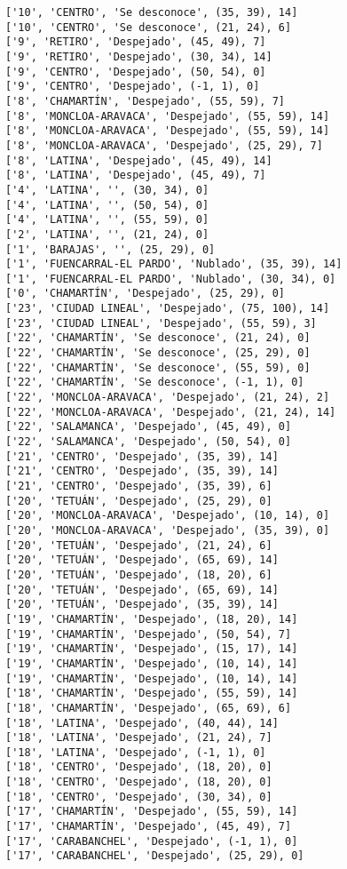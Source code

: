 \documentclass[11pt]{article}
\begin{document}
\begin{Verbatim}[commandchars=\\\{\}]
['10', 'CENTRO', 'Se desconoce', (35, 39), 14]
['10', 'CENTRO', 'Se desconoce', (21, 24), 6]
['9', 'RETIRO', 'Despejado', (45, 49), 7]
['9', 'RETIRO', 'Despejado', (30, 34), 14]
['9', 'CENTRO', 'Despejado', (50, 54), 0]
['9', 'CENTRO', 'Despejado', (-1, 1), 0]
['8', 'CHAMARTÍN', 'Despejado', (55, 59), 7]
['8', 'MONCLOA-ARAVACA', 'Despejado', (55, 59), 14]
['8', 'MONCLOA-ARAVACA', 'Despejado', (55, 59), 14]
['8', 'MONCLOA-ARAVACA', 'Despejado', (25, 29), 7]
['8', 'LATINA', 'Despejado', (45, 49), 14]
['8', 'LATINA', 'Despejado', (45, 49), 7]
['4', 'LATINA', '', (30, 34), 0]
['4', 'LATINA', '', (50, 54), 0]
['4', 'LATINA', '', (55, 59), 0]
['2', 'LATINA', '', (21, 24), 0]
['1', 'BARAJAS', '', (25, 29), 0]
['1', 'FUENCARRAL-EL PARDO', 'Nublado', (35, 39), 14]
['1', 'FUENCARRAL-EL PARDO', 'Nublado', (30, 34), 0]
['0', 'CHAMARTÍN', 'Despejado', (25, 29), 0]
['23', 'CIUDAD LINEAL', 'Despejado', (75, 100), 14]
['23', 'CIUDAD LINEAL', 'Despejado', (55, 59), 3]
['22', 'CHAMARTÍN', 'Se desconoce', (21, 24), 0]
['22', 'CHAMARTÍN', 'Se desconoce', (25, 29), 0]
['22', 'CHAMARTÍN', 'Se desconoce', (55, 59), 0]
['22', 'CHAMARTÍN', 'Se desconoce', (-1, 1), 0]
['22', 'MONCLOA-ARAVACA', 'Despejado', (21, 24), 2]
['22', 'MONCLOA-ARAVACA', 'Despejado', (21, 24), 14]
['22', 'SALAMANCA', 'Despejado', (45, 49), 0]
['22', 'SALAMANCA', 'Despejado', (50, 54), 0]
['21', 'CENTRO', 'Despejado', (35, 39), 14]
['21', 'CENTRO', 'Despejado', (35, 39), 14]
['21', 'CENTRO', 'Despejado', (35, 39), 6]
['20', 'TETUÁN', 'Despejado', (25, 29), 0]
['20', 'MONCLOA-ARAVACA', 'Despejado', (10, 14), 0]
['20', 'MONCLOA-ARAVACA', 'Despejado', (35, 39), 0]
['20', 'TETUÁN', 'Despejado', (21, 24), 6]
['20', 'TETUÁN', 'Despejado', (65, 69), 14]
['20', 'TETUÁN', 'Despejado', (18, 20), 6]
['20', 'TETUÁN', 'Despejado', (65, 69), 14]
['20', 'TETUÁN', 'Despejado', (35, 39), 14]
['19', 'CHAMARTÍN', 'Despejado', (18, 20), 14]
['19', 'CHAMARTÍN', 'Despejado', (50, 54), 7]
['19', 'CHAMARTÍN', 'Despejado', (15, 17), 14]
['19', 'CHAMARTÍN', 'Despejado', (10, 14), 14]
['19', 'CHAMARTÍN', 'Despejado', (10, 14), 14]
['18', 'CHAMARTÍN', 'Despejado', (55, 59), 14]
['18', 'CHAMARTÍN', 'Despejado', (65, 69), 6]
['18', 'LATINA', 'Despejado', (40, 44), 14]
['18', 'LATINA', 'Despejado', (21, 24), 7]
['18', 'LATINA', 'Despejado', (-1, 1), 0]
['18', 'CENTRO', 'Despejado', (18, 20), 0]
['18', 'CENTRO', 'Despejado', (18, 20), 0]
['18', 'CENTRO', 'Despejado', (30, 34), 0]
['17', 'CHAMARTÍN', 'Despejado', (55, 59), 14]
['17', 'CHAMARTÍN', 'Despejado', (45, 49), 7]
['17', 'CARABANCHEL', 'Despejado', (-1, 1), 0]
['17', 'CARABANCHEL', 'Despejado', (25, 29), 0]

\end{Verbatim}
\end{document}

